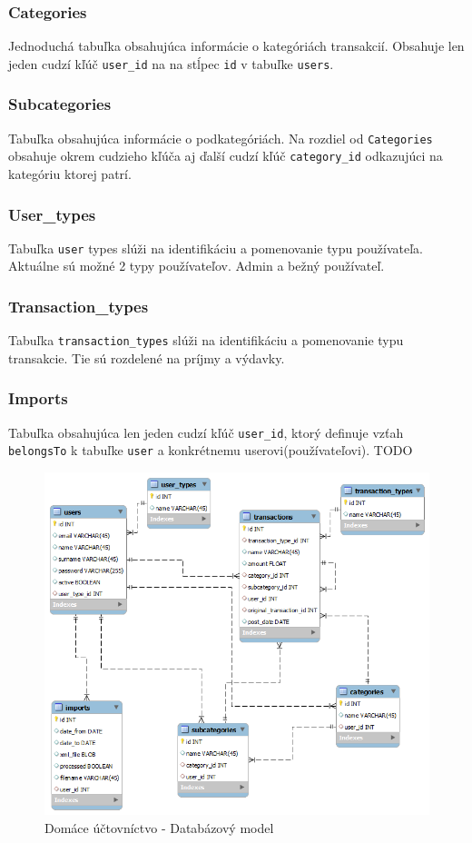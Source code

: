 \documentclass[12pt,oneside]{book}
\begin{document}
\subsubsection{Categories}
Jednoduchá tabuľka obsahujúca informácie o kategóriách transakcií. Obsahuje len jeden cudzí kľúč \texttt{user\_id} na na stĺpec \texttt{id} v tabuľke \texttt{users}. 
\subsubsection{Subcategories}
Tabuľka obsahujúca informácie o podkategóriách. Na rozdiel od \texttt{Categories} obsahuje okrem cudzieho kľúča aj ďalší cudzí kľúč \texttt{category\_id} odkazujúci na kategóriu ktorej patrí.
\subsubsection{User\_types}
Tabuľka \texttt{user} types slúži na identifikáciu a pomenovanie typu používateľa. Aktuálne sú možné 2 typy používateľov. Admin a bežný používateľ.
\subsubsection{Transaction\_types}
Tabuľka \texttt{transaction\_types} slúži na identifikáciu a pomenovanie typu transakcie. Tie sú rozdelené na príjmy a výdavky.
\subsubsection{Imports}
Tabuľka obsahujúca len jeden cudzí kľúč \texttt{user\_id}, ktorý definuje vzťah \texttt{belongsTo} k tabuľke \texttt{user} a konkrétnemu userovi(používateľovi). TODO
\begin{figure}[ht]
  \centering
      \includegraphics[width=15cm]{databazovy_model}
  \caption{Domáce účtovníctvo - Databázový model}
  \label{DataModel}
\end{figure}  
\end{document}
